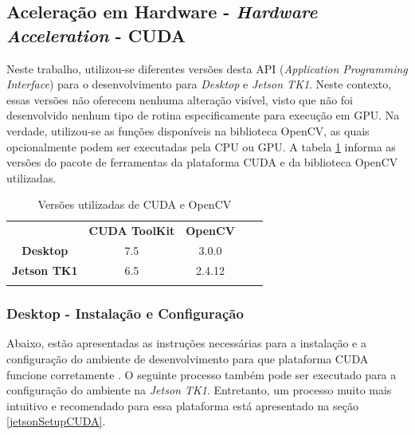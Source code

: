 \subsection{Aceleração em Hardware - \textit{Hardware Acceleration} - CUDA}

Neste trabalho, utilizou-se diferentes versões desta API (\textit{Application Programming Interface}) para o desenvolvimento para \textit{Desktop} e \textit{Jetson TK1}. Neste contexto, essas versões não oferecem nenhuma alteração visível, visto que não foi desenvolvido nenhum tipo de rotina especificamente para execução em GPU. Na verdade, utilizou-se as funções disponíveis na biblioteca OpenCV, as quais opcionalmente podem ser executadas pela CPU ou GPU. A tabela \ref{cudaopencv} informa as versões do pacote de ferramentas da plataforma CUDA e da biblioteca OpenCV utilizadas. 

\begin{table}[]
\centering
\caption{Versões utilizadas de CUDA e OpenCV}
\label{cudaopencv}
\begin{tabular}{cccll}
                     & \textbf{CUDA ToolKit}	     & \textbf{OpenCV} 	       &  &  \\
\textbf{Desktop}     & 7.5                           & 3.0.0                   &  &  \\
\textbf{Jetson TK1}  & 6.5                           & 2.4.12                  &  &  \\
\multicolumn{1}{l}{} & \multicolumn{1}{l}{}          & \multicolumn{1}{l}{}    &  & 
\end{tabular}
\end{table}

\subsubsection{Desktop - Instalação e Configuração}
Abaixo, estão apresentadas as instruções necessárias para a instalação e a configuração do ambiente de desenvolvimento para que plataforma CUDA funcione corretamente . O seguinte processo também pode ser executado para a configuração do ambiente na \textit{Jetson TK1}. Entretanto, um processo muito mais intuitivo e recomendado para essa plataforma está apresentado na seção \ref{jetsonSetupCUDA}.

